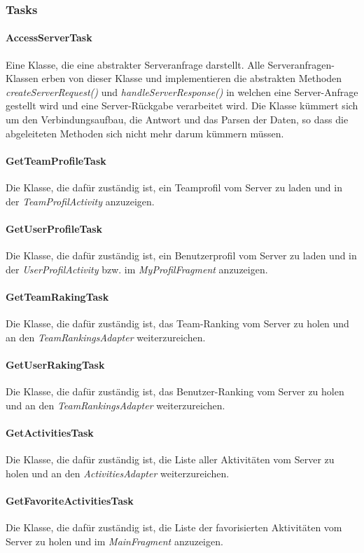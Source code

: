 \subsubsection{Tasks}
\paragraph{AccessServerTask} Eine Klasse, die eine abstrakter Serveranfrage darstellt. Alle Serveranfragen-Klassen erben von dieser Klasse und implementieren die abstrakten Methoden \emph{createServerRequest()} und \emph{handleServerResponse()} in welchen eine Server-Anfrage gestellt wird und eine Server-Rückgabe verarbeitet wird. Die Klasse kümmert sich um den Verbindungsaufbau, die Antwort und das Parsen der Daten, so dass die abgeleiteten Methoden sich nicht mehr darum kümmern müssen.
\paragraph{GetTeamProfileTask} Die Klasse, die dafür zuständig ist, ein Teamprofil vom Server zu laden und in der \emph{TeamProfilActivity} anzuzeigen.
\paragraph{GetUserProfileTask} Die Klasse, die dafür zuständig ist, ein Benutzerprofil vom Server zu laden und in der \emph{UserProfilActivity} bzw. im \emph{MyProfilFragment} anzuzeigen.
\paragraph{GetTeamRakingTask} Die Klasse, die dafür zuständig ist, das Team-Ranking vom Server zu holen und an den \emph{TeamRankingsAdapter} weiterzureichen.
\paragraph{GetUserRakingTask} Die Klasse, die dafür zuständig ist, das Benutzer-Ranking vom Server zu holen und an den \emph{TeamRankingsAdapter} weiterzureichen.
\paragraph{GetActivitiesTask} Die Klasse, die dafür zuständig ist, die Liste aller Aktivitäten vom Server zu holen und an den \emph{ActivitiesAdapter} weiterzureichen.
\paragraph{GetFavoriteActivitiesTask} Die Klasse, die dafür zuständig ist, die Liste der favorisierten Aktivitäten vom Server zu holen und im \emph{MainFragment} anzuzeigen.
